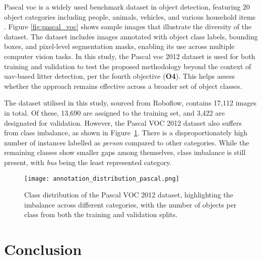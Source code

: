 Pascal \gls{voc} is a widely used benchmark dataset in object detection, featuring 20 object categories including people, animals, vehicles, and various household items \cite{pascal-voc-2012}. Figure \ref{fig:pascal_voc} shows sample images that illustrate the diversity of the dataset. The dataset includes images annotated with object class labels, bounding boxes, and pixel-level segmentation masks, enabling its use across multiple computer vision tasks. In this study, the Pascal \gls{voc} 2012 dataset is used for both training and validation to test the proposed methodology beyond the context of \gls{uav}-based litter detection, per the fourth objective (\textbf{O4}). This helps assess whether the approach remains effective across a broader set of object classes. 

The dataset utilised in this study, sourced from Roboflow, contains 17,112 images in total. Of these, 13,690 are assigned to the training set, and 3,422 are designated for validation. However, the Pascal VOC 2012 dataset also suffers from class imbalance, as shown in Figure~\ref{fig:class_distribution_pascal_voc}. There is a disproportionately high number of instances labelled as \textit{person} compared to other categories. While the remaining classes show smaller gaps among themselves, class imbalance is still present, with \textit{bus} being the least represented category.

\begin{figure}[!ht]
    \centering
    \texttt{[image: annotation\_distribution\_pascal.png]}
    \caption{Class distribution of the Pascal VOC 2012 dataset, highlighting the imbalance across different categories, with the number of objects per class from both the training and validation splits.}
    \label{fig:class_distribution_pascal_voc}%
\end{figure}


\section{Conclusion}
\label{sec:4_conclusion}

